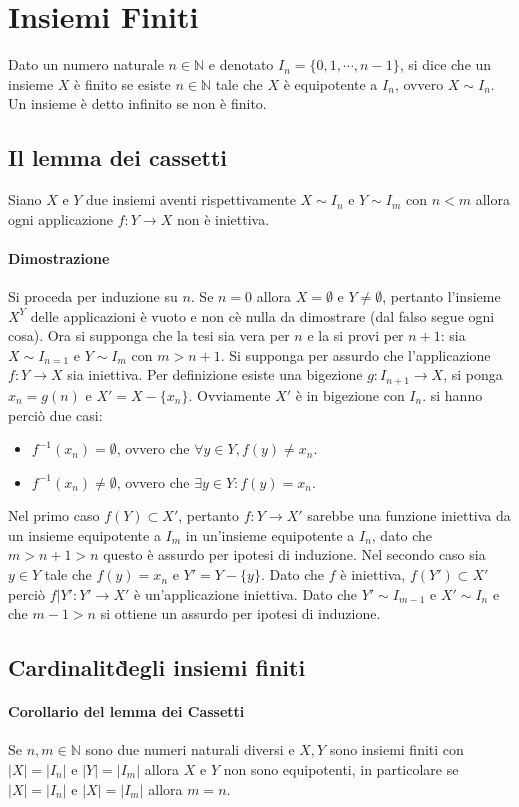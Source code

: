 \chapter{Insiemi Finiti}
Dato un numero naturale $n\in\mathbb{N}$ e denotato $I_n=\{0,1,\cdots, n-1\}$, si dice che un insieme $X$ \`e finito se esiste $n\in\mathbb{N}$ tale che $X$ \`e 
equipotente a $I_n$, ovvero $X\sim I_n$. Un insieme \`e detto infinito se non \`e finito. 
\section{Il lemma dei cassetti}
Siano $X$ e $Y$ due insiemi aventi rispettivamente $X\sim I_n$ e $Y\sim I_m$ con $n<m$ allora ogni applicazione $f:Y\rightarrow X$ non \`e iniettiva.
\subsubsection{Dimostrazione}
Si proceda per induzione su $n$. Se $n=0$ allora $X=\emptyset$ e $Y\neq\emptyset$, pertanto l'insieme $X^Y$ delle applicazioni \`e vuoto e non c\`e nulla da 
dimostrare (dal falso segue ogni cosa). Ora si supponga che la tesi sia vera per $n$ e la si provi per $n+1$: sia $X\sim I_{n=1}$ e $Y\sim I_m$ con $m>n+1$. Si
supponga per assurdo che l'applicazione $f:Y\rightarrow X$ sia iniettiva. Per definizione esiste una bigezione $g:I_{n+1}\rightarrow X$, si ponga $x_n=g(n)$ e 
$X'=X-\{x_n\}$. Ovviamente $X'$ \`e in bigezione con $I_n$. si hanno perci\`o due casi:
\begin{itemize}
\item $f^{-1}(x_n)=\emptyset$, ovvero che $\forall y\in Y, f(y)\neq x_n$.
\item $f^{-1}(x_n)\neq\emptyset$, ovvero che $\exists y\in Y: f(y)=x_n$.
\end{itemize}
Nel primo caso $f(Y)\subset X'$, pertanto $f:Y\rightarrow X'$ sarebbe una funzione iniettiva da un insieme equipotente a $I_m$ in un'insieme equipotente a $I_n$, 
dato che $m>n+1>n$ questo \`e assurdo per ipotesi di induzione. Nel secondo caso sia $y\in Y$ tale che $f(y)=x_n$ e $Y'=Y-\{y\}$. Dato che $f$ \`e iniettiva, 
$f(Y')\subset X'$ perci\`o $f|{Y'}:Y'\rightarrow X'$ \`e un'applicazione iniettiva. Dato che $Y'\sim I_{m-1}$ e $X'\sim I_{n}$ e che $m-1>n$ si ottiene un assurdo
per ipotesi di induzione.
\section{Cardinalit\` degli insiemi finiti}
\subsubsection{Corollario del lemma dei Cassetti}
Se $n,m\in\mathbb{N}$ sono due numeri naturali diversi e $X,Y$ sono insiemi finiti con $|X|=|I_n|$ e $|Y|=|I_m|$ allora $X$ e $Y$ non sono equipotenti, in 
particolare se $|X|=|I_n|$ e $|X|=|I_m|$ allora $m=n$.
